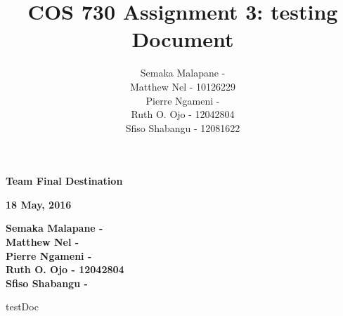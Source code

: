 \documentclass[a4paper]{article}
\title{COS 730 Assignment 3: testing Document}
\author{Semaka Malapane -  \\
		Matthew Nel -  10126229\\
		Pierre Ngameni -  \\
		Ruth O. Ojo - 12042804 \\
		Sfiso Shabangu - 12081622 }
\begin{document}
	


\begin{titlepage}
    \begin{center}
        \vspace*{1.5cm}        
        \Huge
        \textbf{Team Final Destination}

        \vspace{1.5cm}        
        \large
        \textbf{18 May, 2016}
        
        \vspace{1.0cm}
        
		\large       
	        \textbf{Semaka Malapane -  }\\
			\textbf{Matthew Nel - } \\
			\textbf{Pierre Ngameni -  }\\
			\textbf{Ruth O. Ojo - 12042804 }\\
			\textbf{Sfiso Shabangu - }        
        
        
    \end{center}
\end{titlepage}


\pagebreak
\tableofcontents
\pagebreak

{testDoc}



\end{document}
